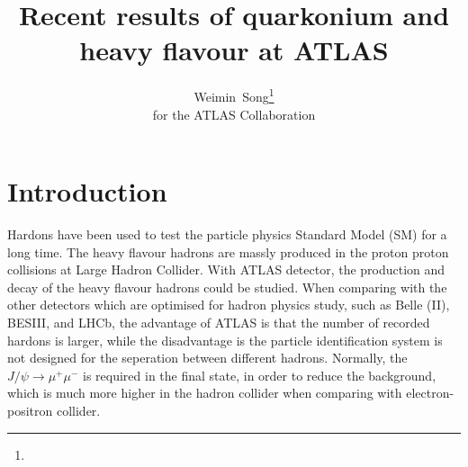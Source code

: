\documentclass[epj]{webofc}
\begin{document}
%
\title{Recent results of quarkonium and heavy flavour at ATLAS}

\author{Weimin~Song\fnsep\thanks{}
       \\for the ATLAS Collaboration
}


%
\maketitle
%
\section{Introduction}
\label{intro}

Hardons have been used to test the particle physics Standard Model (SM) for a long time.
The heavy flavour hadrons are massly produced in the proton proton collisions at Large Hadron Collider.
With ATLAS detector, the production and decay of the heavy flavour hadrons could be studied. 
When comparing with the other detectors which are optimised for hadron physics study, such as Belle (II), BESIII, and
LHCb, the advantage of ATLAS is that the number of recorded hardons is larger, while the disadvantage is the particle identification 
system is not designed for the seperation between different hadrons. 
Normally, the $J/\psi \to \mu^{+} \mu^{-}$ is required in the final state, in order to reduce the background, which is much more
higher in the hadron collider when comparing with electron-positron collider.\\ 
\end{document}
